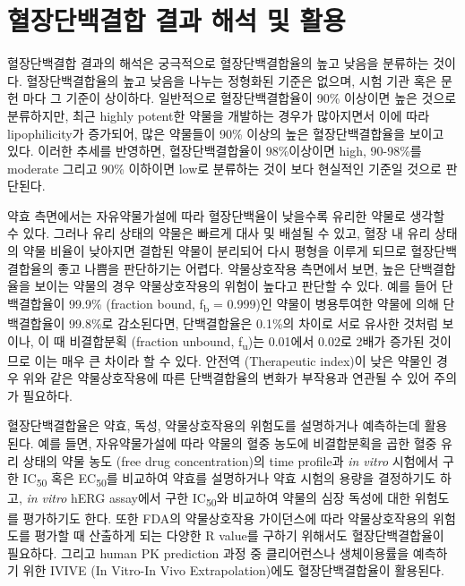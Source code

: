 \documentclass[
  11pt,
  krantz2, a4paper, twoside]{krantz}
\begin{document}
\hypertarget{uxd608uxc7a5uxb2e8uxbc31uxacb0uxd569-uxacb0uxacfc-uxd574uxc11d-uxbc0f-uxd65cuxc6a9}{%
\section{혈장단백결합 결과 해석 및 활용}\label{uxd608uxc7a5uxb2e8uxbc31uxacb0uxd569-uxacb0uxacfc-uxd574uxc11d-uxbc0f-uxd65cuxc6a9}}

혈장단백결합 결과의 해석은 궁극적으로 혈장단백결합율의 높고 낮음을
분류하는 것이다. 혈장단백결합율의 높고 낮음을 나누는 정형화된 기준은
없으며, 시험 기관 혹은 문헌 마다 그 기준이 상이하다. 일반적으로
혈장단백결합율이 90\% 이상이면 높은 것으로 분류하지만, 최근 highly
potent한 약물을 개발하는 경우가 많아지면서 이에 따라 lipophilicity가
증가되어, 많은 약물들이 90\% 이상의 높은 혈장단백결합율을 보이고 있다.
이러한 추세를 반영하면, 혈장단백결합율이 98\%이상이면 high, 90-98\%를
moderate 그리고 90\% 이하이면 low로 분류하는 것이 보다 현실적인 기준일
것으로 판단된다.

약효 측면에서는 자유약물가설에 따라 혈장단백율이 낮을수록 유리한 약물로
생각할 수 있다. 그러나 유리 상태의 약물은 빠르게 대사 및 배설될 수 있고,
혈장 내 유리 상태의 약물 비율이 낮아지면 결합된 약물이 분리되어 다시
평형을 이루게 되므로 혈장단백결합율의 좋고 나쁨을 판단하기는 어렵다.
약물상호작용 측면에서 보면, 높은 단백결합율을 보이는 약물의 경우
약물상호작용의 위험이 높다고 판단할 수 있다. 예를 들어 단백결합율이
99.9\% (fraction bound, f\textsubscript{b} = 0.999)인 약물이 병용투여한 약물에 의해
단백결합율이 99.8\%로 감소된다면, 단백결합율은 0.1\%의 차이로 서로 유사한
것처럼 보이나, 이 때 비결합분획 (fraction unbound, f\textsubscript{u})는 0.01에서
0.02로 2배가 증가된 것이므로 이는 매우 큰 차이라 할 수 있다. 안전역
(Therapeutic index)이 낮은 약물인 경우 위와 같은 약물상호작용에 따른
단백결합율의 변화가 부작용과 연관될 수 있어 주의가 필요하다.

혈장단백결합율은 약효, 독성, 약물상호작용의 위험도를 설명하거나
예측하는데 활용된다. 예를 들면, 자유약물가설에 따라 약물의 혈중 농도에
비결합분획을 곱한 혈중 유리 상태의 약물 농도 (free drug concentration)의
time profile과 \emph{in vitro} 시험에서 구한 IC\textsubscript{50} 혹은 EC\textsubscript{50}를 비교하여
약효를 설명하거나 약효 시험의 용량을 결정하기도 하고, \emph{in vitro} hERG
assay에서 구한 IC\textsubscript{50}와 비교하여 약물의 심장 독성에 대한 위험도를
평가하기도 한다. 또한 FDA의 약물상호작용 가이던스에 따라 약물상호작용의
위험도를 평가할 때 산출하게 되는 다양한 R value를 구하기 위해서도
혈장단백결합율이 필요하다. 그리고 human PK prediction 과정 중
클리어런스나 생체이용률을 예측하기 위한 IVIVE (In Vitro-In Vivo
Extrapolation)에도 혈장단백결합율이 활용된다.
\end{document}
